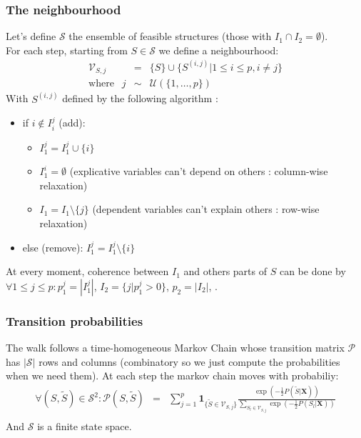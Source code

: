 \documentclass[11pt,a4paper]{article}
\begin{document}
	\subsubsection{The neighbourhood}
	Let's define $\mathcal{S}$ the ensemble of feasible structures (those with $I_1\cap I_2=\emptyset$).
	\\
	For each step, starting from $S \in \mathcal{S}$ we define a neighbourhood:
		\begin{eqnarray}
		\mathcal{V}_{S,j}&=& \{S \}\cup \{ S^{(i,j)} |1\leq i \leq p, i\neq j  \} \\
		\textrm{where }\ \ j &\sim & \mathcal{U}(\{1,\dots,p\}) 
	\end{eqnarray}	
	With $S^{(i,j)}$ defined by the following algorithm :
	\begin{itemize}
		\item if $i \notin I_i^j$ (add): 
			\begin{itemize}
				\item $I_1^j=I_1^j\cup \{i\}$
				\item $I_1^i=\emptyset$ (explicative variables can't depend on others : column-wise relaxation)
				\item $I_1=I_1 \setminus \{j\}$ (dependent variables can't explain others : row-wise relaxation) 
			\end{itemize}			 
		\item else (remove): $I_1^j=I_1^j\setminus \{i\}$
	\end{itemize}
	
	\smallskip
	At every moment, coherence between $I_1$ and others parts of $S$ can be done by $\forall 1\leq j\leq p :  p_1^j=|I_1^j|$, $I_2=\{j |p_1^j>0 \}$, $p_2= |I_2|$, .
		
	\subsubsection{Transition probabilities}
	
	The walk follows a time-homogeneous Markov Chain whose transition matrix $\mathcal{P}$ has $|\mathcal{S}|$ rows and columns (combinatory so we just compute the probabilities when we need them).
	At each step the markov chain moves with probabiliy:
	\begin{eqnarray}
			\forall (S,\tilde{S}) \in \mathcal{S}^2 : \mathcal{P}(S,\tilde{S})&=&\sum_{j=1}^p \mathbf{1}_{ \{\tilde{S}\in \mathcal{V}_{S,j}\} }\frac{\exp(-\frac{1}{2}P(\tilde{S}|\boldsymbol{X}))}{\sum_{S_l\in \mathcal{V}_{S,j}}\exp(-\frac{1}{2}P(S_l|\boldsymbol{X}))} \\
	\end{eqnarray}
	And $\mathcal{S}$ is a finite state space.%
	 
\end{document}
